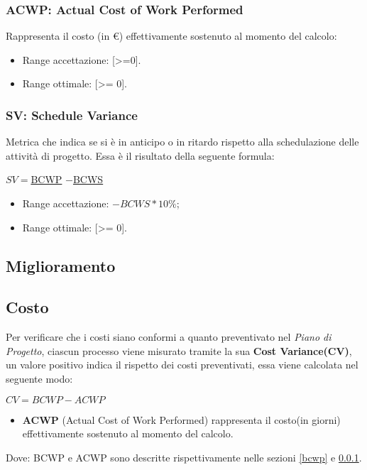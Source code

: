 \subsubsection{ACWP: Actual Cost of Work Performed}\label{acwp}
Rappresenta il costo (in \euro) effettivamente sostenuto al momento del calcolo:
\begin{itemize}
	\item Range accettazione: [>=0].
	\item Range ottimale: [>= 0].
\end{itemize}

\subsubsection{SV: Schedule Variance}
Metrica che indica se si è in anticipo o in ritardo rispetto alla schedulazione delle attività di progetto.
Essa è il risultato della seguente formula:\\
\begin{center}
	
	$SV = $\hyperref[bcwp]{BCWP} $-$\hyperref[bcws]{BCWS}
	
\end{center}

\begin{itemize}
	\item Range accettazione: $-BCWS *10\%$;
	\item Range ottimale: [>= 0].
\end{itemize}



\subsection{Miglioramento}
\subsection{Costo}
Per verificare che i costi siano conformi a quanto preventivato nel \textit{Piano di Progetto}, ciascun processo viene misurato tramite la sua \textbf{Cost Variance(CV)}, un valore positivo indica il rispetto dei costi preventivati, essa viene calcolata nel seguente modo:\\ 

\begin{center}
	\begin{math}
	CV = BCWP - ACWP
	\end{math}
\end{center}
\begin{itemize}
	\item[] \textbf{ACWP} (Actual Cost of Work Performed) rappresenta il costo(in giorni) effettivamente sostenuto al momento del calcolo. 
\end{itemize}
Dove: BCWP e ACWP sono descritte rispettivamente nelle sezioni \ref{bcwp} e \ref{acwp}.

